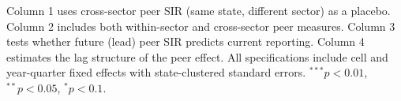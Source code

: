 \begin{table}[htbp]
   \par \raggedright 
   Column 1 uses cross-sector peer SIR (same state, different sector) as a placebo. Column 2 includes both within-sector and cross-sector peer measures. Column 3 tests whether future (lead) peer SIR predicts current reporting. Column 4 estimates the lag structure of the peer effect. All specifications include cell and year-quarter fixed effects with state-clustered standard errors. $^{***}p<0.01$, $^{**}p<0.05$, $^{*}p<0.1$.
\end{table}


